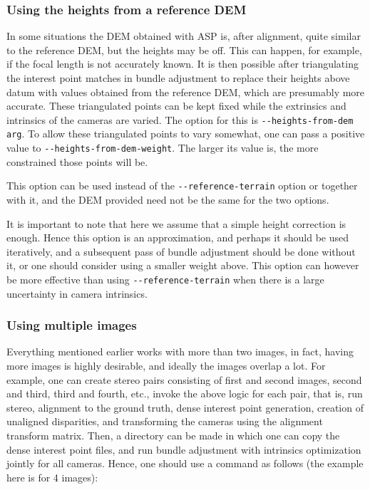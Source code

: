 \subsubsection{Using the heights from a reference DEM}

In some situations the DEM obtained with ASP is, after alignment, quite
similar to the reference DEM, but the heights may be off. This can
happen, for example, if the focal length is not accurately known. It is
then possible after triangulating the interest point matches in bundle
adjustment to replace their heights above datum with values obtained
from the reference DEM, which are presumably more accurate. These
triangulated points can be kept fixed while the extrinsics and
intrinsics of the cameras are varied. The option for this is
\texttt{-\/-heights-from-dem arg}. To allow these triangulated
points to vary somewhat, one can pass a positive value to 
\texttt{-\/-heights-from-dem-weight}. The larger its value is,
the more constrained those points will be.  

This option can be used instead of the \texttt{-\/-reference-terrain}
option or together with it, and the DEM provided need not be the same for the two options.

It is important to note that here we assume that a simple height correction 
is enough. Hence this option is an approximation, and perhaps it should be used
iteratively, and a subsequent pass of bundle adjustment should be done without it,
or one should consider using a smaller weight above.
This option can however be more effective than using \texttt{-\/-reference-terrain}
when there is a large uncertainty in camera intrinsics. 

\subsubsection{Using multiple images}

Everything mentioned earlier works with more than two images, in fact,
having more images is highly desirable, and ideally the images overlap a
lot. For example, one can create stereo pairs consisting of first and
second images, second and third, third and fourth, etc., invoke the
above logic for each pair, that is, run stereo, alignment to the ground
truth, dense interest point generation, creation of unaligned
disparities, and transforming the cameras using the alignment transform
matrix. Then, a directory can be made in which one can copy the dense
interest point files, and run bundle adjustment with intrinsics
optimization jointly for all cameras. Hence, one should use a command as
follows (the example here is for 4 images):

